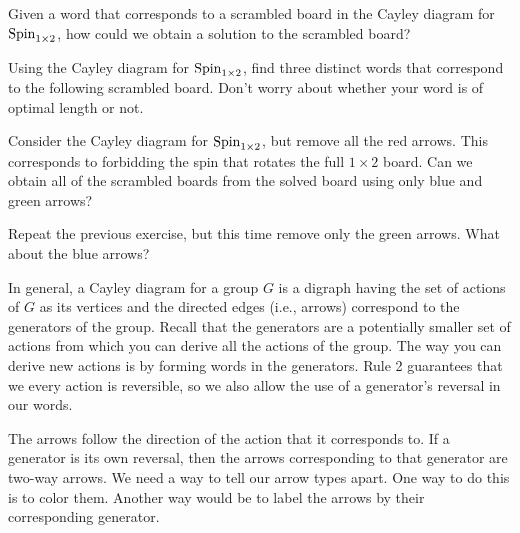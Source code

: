\begin{exercise}
Given a word that corresponds to a scrambled board in the Cayley diagram for $\operatorname{Spin}_{1\times 2}$, how could we obtain a solution to the scrambled board?
\end{exercise}

\begin{exercise}
Using the Cayley diagram for $\operatorname{Spin}_{1\times 2}$, find three distinct words that correspond to the following scrambled board.  Don't worry about whether your word is of optimal length or not.

\begin{center}
\end{center}
\end{exercise}

\begin{exercise}
Consider the Cayley diagram for $\operatorname{Spin}_{1\times 2}$, but remove all the red arrows.  This corresponds to forbidding the spin that rotates the full $1\times 2$ board.  Can we obtain all of the scrambled boards from the solved board using only blue and green arrows?
\end{exercise}

\begin{exercise}
Repeat the previous exercise, but this time remove only the green arrows.  What about the blue arrows?
\end{exercise}

In general, a Cayley diagram for a group $G$ is a digraph having the set of actions of $G$ as its vertices and the directed edges (i.e., arrows) correspond to the generators of the group.  Recall that the generators are a potentially smaller set of actions from which you can derive all the actions of the group.  The way you can derive new actions is by forming words in the generators.  Rule 2 guarantees that we every action is reversible, so we also allow the use of a generator's reversal in our words.  

The arrows follow the direction of the action that it corresponds to. If a generator is its own reversal, then the arrows corresponding to that generator are two-way arrows.  We need a way to tell our arrow types apart.  One way to do this is to color them.  Another way would be to label the arrows by their corresponding generator.

